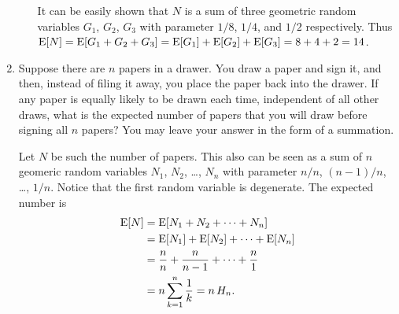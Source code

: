 \begin{enumerate}
\begin{enumerate}
    It can be easily shown that \(N\) is a sum of three geometric random
    variables \(G_1\), \(G_2\), \(G_3\) with parameter \(1/8\), \(1/4\),
    and \(1/2\) respectively. Thus
    \(\operatorname{E}[N] = \operatorname{E}[G_1+ G_2 + G_3] = \operatorname{E}[G_1] + \operatorname{E}[G_2] + \operatorname{E}[G_3] = 8 + 4 + 2
    = 14\).
  \end{enumerate}
\item Suppose there are \(n\) papers in a drawer.  You draw a paper and
  sign it, and then, instead of filing it away, you place the paper back
  into the drawer.  If any paper is equally likely to be drawn each time,
  independent of all other draws, what is the expected number of papers
  that you will draw before signing all \(n\) papers?  You may leave your
  answer in the form of a summation. \parasp

  Let \(N\) be such the number of papers.  This also can be seen as a sum
  of \(n\) geomeric random variables \(N_1\), \(N_2\), \dots, \(N_n\) with
  parameter \(n/n\), \((n-1)/n\), \dots, \(1/n\).  Notice that the first
  random variable is degenerate.  The expected number is
  \begin{align*}
    \operatorname{E}[N] &= \operatorname{E}[N_1 + N_2 + \dots + N_n] \\
          &= \operatorname{E}[N_1]+ \operatorname{E}[N_2] + \dots + \operatorname{E}[N_n] \\
          &= \frac{n}{n} + \frac{n}{n-1} + \dots + \frac{n}{1} \\
          &= n \sum_{k=1}^n \frac1k = n \, H_n.
  \end{align*}
\end{enumerate}
